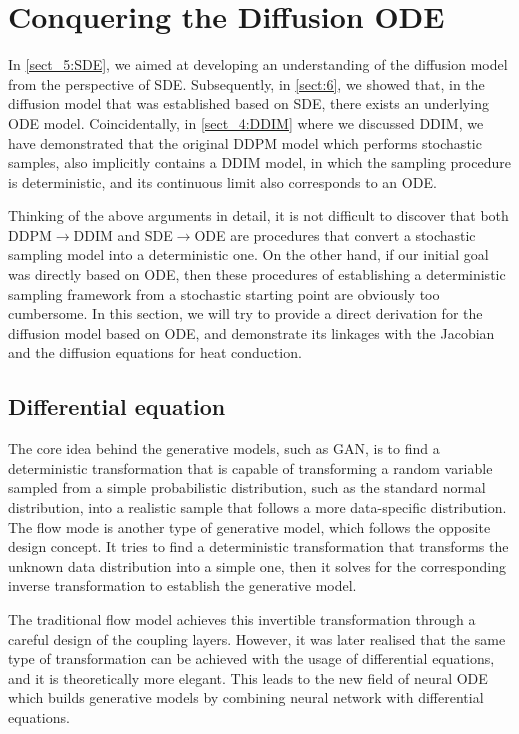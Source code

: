 \section{Conquering the Diffusion ODE}
\label{sect_12}

In \cref{sect_5:SDE}, we aimed at developing an understanding of the diffusion model from the perspective of SDE. Subsequently, in \cref{sect:6}, we showed that, in the diffusion model that was established based on SDE, there exists an underlying ODE model. Coincidentally, in \cref{sect_4:DDIM} where we discussed DDIM, we have demonstrated that the original DDPM model which performs stochastic samples, also implicitly contains a DDIM model, in which the sampling procedure is deterministic, and its continuous limit also corresponds to an ODE. 

Thinking of the above arguments in detail, it is not difficult to discover that both DDPM$\to$DDIM and SDE$\to$ODE are procedures that convert a stochastic sampling model into a deterministic one. On the other hand, if our initial goal was directly based on ODE, then these procedures of establishing a deterministic sampling framework from a stochastic starting point are obviously too cumbersome. In this section, we will try to provide a direct derivation for the diffusion model based on ODE, and demonstrate its linkages with the Jacobian and the diffusion equations for heat conduction. 

\subsection{Differential equation}

The core idea behind the generative models, such as GAN, is to find a deterministic transformation that is capable of transforming a random variable sampled from a simple probabilistic distribution, such as the standard normal distribution, into a realistic sample that follows a more data-specific distribution. The flow mode is another type of generative model, which follows the opposite design concept. It tries to find a deterministic transformation that transforms the unknown data distribution into a simple one, then it solves for the corresponding inverse transformation to establish the generative model. 

The traditional flow model achieves this invertible transformation through a careful design of the coupling layers. However, it was later realised that the same type of transformation can be achieved with the usage of differential equations, and it is theoretically more elegant. This leads to the new field of neural ODE which builds generative models by combining neural network with differential equations. 

